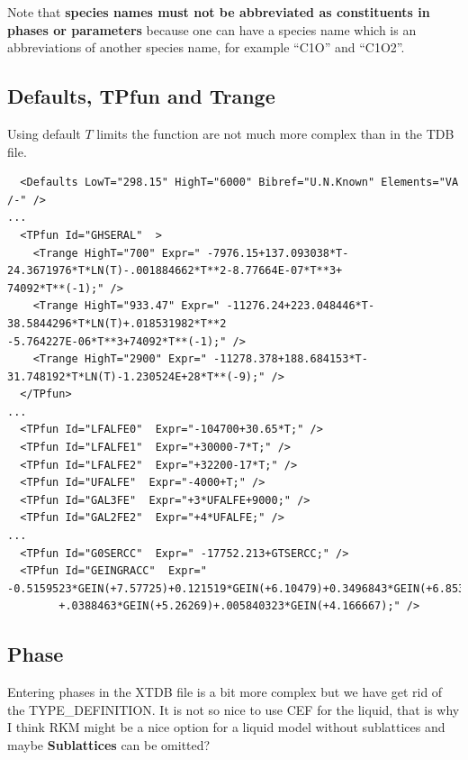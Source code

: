 \documentclass{article}
\begin{document}
\begin{appendices}
Note that {\bf species names must not be abbreviated as constituents
  in phases or parameters} because one can have a species name which
is an abbreviations of another species name, for example ``C1O'' and
``C1O2''.

\subsection{Defaults, TPfun and Trange}\label{sec:tpfuns}

Using default $T$ limits the function are not much more complex than
in the TDB file.

{\small
\begin{verbatim}
  <Defaults LowT="298.15" HighT="6000" Bibref="U.N.Known" Elements="VA /-" />
...
  <TPfun Id="GHSERAL"  >
    <Trange HighT="700" Expr=" -7976.15+137.093038*T-24.3671976*T*LN(T)-.001884662*T**2-8.77664E-07*T**3+
74092*T**(-1);" />
    <Trange HighT="933.47" Expr=" -11276.24+223.048446*T-38.5844296*T*LN(T)+.018531982*T**2
-5.764227E-06*T**3+74092*T**(-1);" />
    <Trange HighT="2900" Expr=" -11278.378+188.684153*T-31.748192*T*LN(T)-1.230524E+28*T**(-9);" />
  </TPfun>
...
  <TPfun Id="LFALFE0"  Expr="-104700+30.65*T;" />
  <TPfun Id="LFALFE1"  Expr="+30000-7*T;" />
  <TPfun Id="LFALFE2"  Expr="+32200-17*T;" />
  <TPfun Id="UFALFE"  Expr="-4000+T;" />
  <TPfun Id="GAL3FE"  Expr="+3*UFALFE+9000;" />
  <TPfun Id="GAL2FE2"  Expr="+4*UFALFE;" />
...
  <TPfun Id="G0SERCC"  Expr=" -17752.213+GTSERCC;" /> 
  <TPfun Id="GEINGRACC"  Expr=" -0.5159523*GEIN(+7.57725)+0.121519*GEIN(+6.10479)+0.3496843*GEIN(+6.8533)
        +.0388463*GEIN(+5.26269)+.005840323*GEIN(+4.166667);" /> 
\end{verbatim}
}

\subsection{Phase}\label{sec:phaseexample}

Entering phases in the XTDB file is a bit more complex but we have get
rid of the TYPE\_DEFINITION.  It is not so nice to use CEF for the
liquid, that is why I think RKM might be a nice option for a liquid
model without sublattices and maybe {\bf Sublattices} can be omitted?


\end{appendices}
\end{document}
